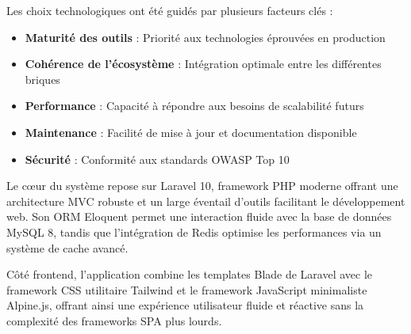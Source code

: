 \documentclass[french,12pt]{report} %
\let\oldfigure\figure
\let\endoldfigure\endfigure
\renewenvironment{figure}[1][H]{
    \oldfigure[#1]\centering
}{
    \endoldfigure
}
\begin{document}
\begin{figure}[H]
\begin{mdframed}[style=figstyle]
\end{mdframed}
\caption{Stack technologique du projet}
\label{fig:stack-technique}
\end{figure}

Les choix technologiques ont été guidés par plusieurs facteurs clés :

\begin{itemize}
    \item \textbf{Maturité des outils} : Priorité aux technologies éprouvées en production
    \item \textbf{Cohérence de l'écosystème} : Intégration optimale entre les différentes briques
    \item \textbf{Performance} : Capacité à répondre aux besoins de scalabilité futurs
    \item \textbf{Maintenance} : Facilité de mise à jour et documentation disponible
    \item \textbf{Sécurité} : Conformité aux standards OWASP Top 10
\end{itemize}

Le cœur du système repose sur Laravel 10, framework PHP moderne offrant une architecture MVC robuste et un large éventail d'outils facilitant le développement web. Son ORM Eloquent permet une interaction fluide avec la base de données MySQL 8, tandis que l'intégration de Redis optimise les performances via un système de cache avancé.

Côté frontend, l'application combine les templates Blade de Laravel avec le framework CSS utilitaire Tailwind et le framework JavaScript minimaliste Alpine.js, offrant ainsi une expérience utilisateur fluide et réactive sans la complexité des frameworks SPA plus lourds.
\end{document}
